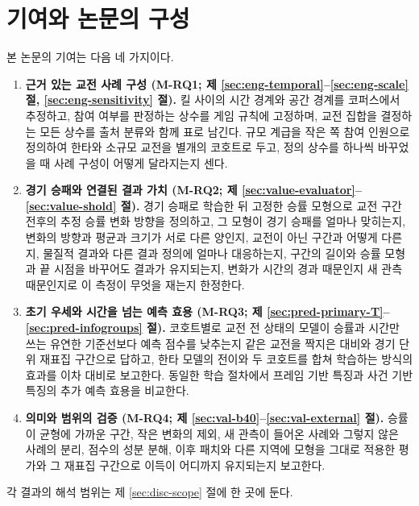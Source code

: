 \section{기여와 논문의 구성}
\label{sec:intro-contrib}

본 논문의 기여는 다음 네 가지이다.

\begin{enumerate}[leftmargin=2em]
  \item \textbf{근거 있는 교전 사례 구성 (M-RQ1; 제 \ref{sec:eng-temporal}--\ref{sec:eng-scale} 절, \ref{sec:eng-sensitivity} 절).} 킬 사이의 시간 경계와 공간 경계를 코퍼스에서 추정하고, 참여 여부를 판정하는 상수를 게임 규칙에 고정하며, 교전 집합을 결정하는 모든 상수를 출처 분류와 함께 표로 남긴다. 규모 계급을 작은 쪽 참여 인원으로 정의하여 한타와 소규모 교전을 별개의 코호트로 두고, 정의 상수를 하나씩 바꾸었을 때 사례 구성이 어떻게 달라지는지 센다.
  \item \textbf{경기 승패와 연결된 결과 가치 (M-RQ2; 제 \ref{sec:value-evaluator}--\ref{sec:value-shold} 절).} 경기 승패로 학습한 뒤 고정한 승률 모형으로 교전 구간 전후의 추정 승률 변화 방향을 정의하고, 그 모형이 경기 승패를 얼마나 맞히는지, 변화의 방향과 평균과 크기가 서로 다른 양인지, 교전이 아닌 구간과 어떻게 다른지, 물질적 결과와 다른 결과 정의에 얼마나 대응하는지, 구간의 길이와 승률 모형과 끝 시점을 바꾸어도 결과가 유지되는지, 변화가 시간의 경과 때문인지 새 관측 때문인지로 이 측정이 무엇을 재는지 한정한다.
  \item \textbf{초기 우세와 시간을 넘는 예측 효용 (M-RQ3; 제 \ref{sec:pred-primary-T}--\ref{sec:pred-infogroups} 절).} 코호트별로 교전 전 상태의 모델이 승률과 시간만 쓰는 유연한 기준선보다 예측 점수를 낮추는지 같은 교전을 짝지은 대비와 경기 단위 재표집 구간으로 답하고, 한타 모델의 전이와 두 코호트를 합쳐 학습하는 방식의 효과를 이차 대비로 보고한다. 동일한 학습 절차에서 프레임 기반 특징과 사건 기반 특징의 추가 예측 효용을 비교한다.
  \item \textbf{의미와 범위의 검증 (M-RQ4; 제 \ref{sec:val-b40}--\ref{sec:val-external} 절).} 승률이 균형에 가까운 구간, 작은 변화의 제외, 새 관측이 들어온 사례와 그렇지 않은 사례의 분리, 점수의 성분 분해, 이후 패치와 다른 지역에 모형을 그대로 적용한 평가와 그 재표집 구간으로 이득이 어디까지 유지되는지 보고한다.
\end{enumerate}

각 결과의 해석 범위는 제 \ref{sec:disc-scope} 절에 한 곳에 둔다.

